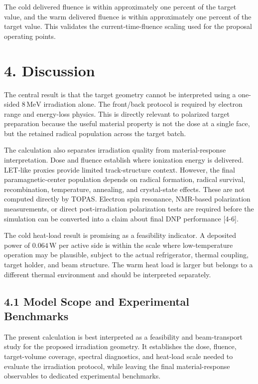 \documentclass[
  12pt,
]{article}
\begin{document}
The cold delivered fluence is within approximately one percent of the
target value, and the warm delivered fluence is within approximately one
percent of the target value. This validates the current-time-fluence
scaling used for the proposal operating points.

\hypertarget{discussion}{%
\section{4. Discussion}\label{discussion}}

The central result is that the target geometry cannot be interpreted
using a one-sided \(8\,\mathrm{MeV}\) irradiation alone. The front/back
protocol is required by electron range and energy-loss physics. This is
directly relevant to polarized target preparation because the useful
material property is not the dose at a single face, but the retained
radical population across the target batch.

The calculation also separates irradiation quality from
material-response interpretation. Dose and fluence establish where
ionization energy is delivered. LET-like proxies provide limited
track-structure context. However, the final paramagnetic-center
population depends on radical formation, radical survival,
recombination, temperature, annealing, and crystal-state effects. These
are not computed directly by TOPAS. Electron spin resonance, NMR-based
polarization measurements, or direct post-irradiation polarization tests
are required before the simulation can be converted into a claim about
final DNP performance {[}4-6{]}.

The cold heat-load result is promising as a feasibility indicator. A
deposited power of \(0.064\,\mathrm{W}\) per active side is within the
scale where low-temperature operation may be plausible, subject to the
actual refrigerator, thermal coupling, target holder, and beam
structure. The warm heat load is larger but belongs to a different
thermal environment and should be interpreted separately.

\hypertarget{model-scope-and-experimental-benchmarks}{%
\subsection{4.1 Model Scope and Experimental
Benchmarks}\label{model-scope-and-experimental-benchmarks}}

The present calculation is best interpreted as a feasibility and
beam-transport study for the proposed irradiation geometry. It
establishes the dose, fluence, target-volume coverage, spectral
diagnostics, and heat-load scale needed to evaluate the irradiation
protocol, while leaving the final material-response observables to
dedicated experimental benchmarks.
\end{document}

